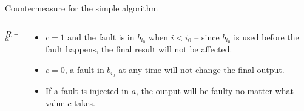 \begin{frame}{Countermeasure for the simple algorithm}
\begin{columns}[T] %
\begin{column}{.45\textwidth}
{
\setlength{\interspacetitleruled}{0pt}%
\setlength{\algotitleheightrule}{0pt}%
\begin{algorithm}[H]
$R=0$\\
  	\Return $a$
\end{algorithm}}
\end{column}%
\hfill%
\begin{column}{.55\textwidth}
\begin{itemize}
    \item $c=1$ and the fault is in $b_{i_0}$ when $i<i_0$ -- since $b_{i_0}$ is used before the fault happens, the final result will not be affected.
    \item $c=0$, a fault in $b_{i_0}$ at any time will not change the final output.
     \item If a fault is injected in $a$, the output will be faulty no matter what value $c$ takes.
\end{itemize}
\end{column}%
\end{columns}
\end{frame}

